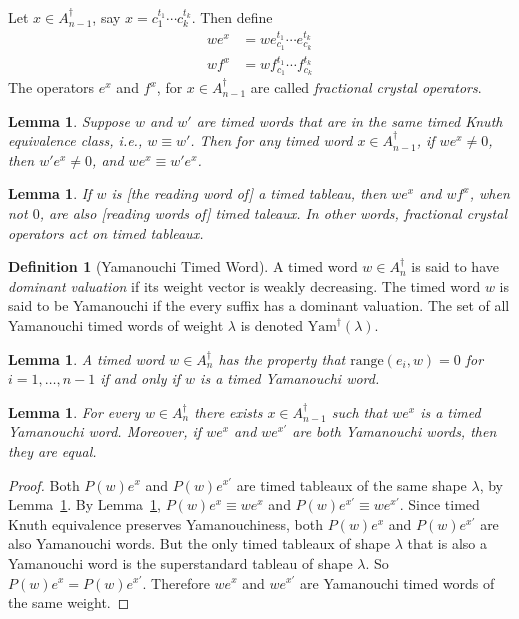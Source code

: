 \documentclass[12pt]{amsproc}
\newcommand{\Yam}{\mathrm{Yam}}
\newcommand{\range}{\mathrm{range}}
\newtheorem{lemma}[theorem]{Lemma}
\theoremstyle{definition}
\newtheorem{definition}[theorem]{Definition}
\begin{document}
Let $x\in A_{n-1}^\dagger$, say $x=c_1^{t_1}\dotsb c_k^{t_k}$.
Then define
\begin{align*}
  we^x & = w e_{c_1}^{t_1}\dotsb e_{c_k}^{t_k}\\
  w f^x & = w f_{c_1}^{t_1}\dotsb f_{c_k}^{t_k}
\end{align*}
The operators $e^x$ and $f^x$, for $x\in A_{n-1}^\dagger$ are called \emph{fractional crystal operators}.
\begin{lemma}
  \label{lemma:crystal-knuth}
  Suppose $w$ and $w'$ are timed words that are in the same timed Knuth equivalence class, i.e., $w\equiv w'$.
  Then for any timed word $x\in A_{n-1}^\dagger$, if $we^x\neq 0$, then $w'e^x\neq 0$, and $we^x\equiv w'e^x$.
\end{lemma}
\begin{lemma}
  \label{lemma:tableau-crystal}
  If $w$ is [the reading word of] a timed tableau, then $we^x$ and $wf^x$, when not $0$, are also [reading words of] timed taleaux.
  In other words, fractional crystal operators act on timed tableaux.
\end{lemma}
\begin{definition}
  [Yamanouchi Timed Word]
  A timed word $w\in A_n^\dagger$ is said to have \emph{dominant valuation} if its weight vector is weakly decreasing.
  The timed word $w$ is said to be Yamanouchi if the every suffix has a dominant valuation.
  The set of all Yamanouchi timed words of weight $\lambda$ is denoted $\Yam^\dagger(\lambda)$.
\end{definition}
\begin{lemma}
  A timed word $w\in A_n^\dagger$ has the property that $\range(e_i,w)=0$ for $i=1,\dotsc,n-1$ if and only if $w$ is a timed Yamanouchi word.
\end{lemma}
\begin{lemma}
  For every $w\in A_n^\dagger$ there exists $x\in A_{n-1}^\dagger$ such that $we^x$ is a timed Yamanouchi word.
  Moreover, if $we^x$ and $we^{x'}$ are both Yamanouchi words, then they are equal.
\end{lemma}
\begin{proof}
  Both $P(w)e^x$ and $P(w)e^{x'}$ are timed tableaux of the same shape $\lambda$, by Lemma~\ref{lemma:tableau-crystal}.
  By Lemma~\ref{lemma:crystal-knuth}, $P(w)e^x\equiv we^x$ and $P(w)e^{x'}\equiv we^{x'}$.
  Since timed Knuth equivalence preserves Yamanouchiness, both $P(w)e^x$ and $P(w)e^{x'}$ are also Yamanouchi words.
  But the only timed tableaux of shape $\lambda$ that is also a Yamanouchi word is the superstandard tableau of shape $\lambda$.
  So $P(w)e^x=P(w)e^{x'}$.
  Therefore $we^x$ and $we^{x'}$ are Yamanouchi timed words of the same weight.
\end{proof}
\end{document}
